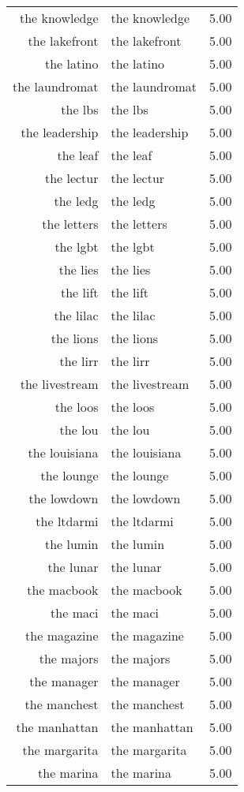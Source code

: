\begin{table}[ht]
\begin{tabular}{rlr}
  the knowledge & the knowledge & 5.00 \\ 
  the lakefront & the lakefront & 5.00 \\ 
  the latino & the latino & 5.00 \\ 
  the laundromat & the laundromat & 5.00 \\ 
  the lbs & the lbs & 5.00 \\ 
  the leadership & the leadership & 5.00 \\ 
  the leaf & the leaf & 5.00 \\ 
  the lectur & the lectur & 5.00 \\ 
  the ledg & the ledg & 5.00 \\ 
  the letters & the letters & 5.00 \\ 
  the lgbt & the lgbt & 5.00 \\ 
  the lies & the lies & 5.00 \\ 
  the lift & the lift & 5.00 \\ 
  the lilac & the lilac & 5.00 \\ 
  the lions & the lions & 5.00 \\ 
  the lirr & the lirr & 5.00 \\ 
  the livestream & the livestream & 5.00 \\ 
  the loos & the loos & 5.00 \\ 
  the lou & the lou & 5.00 \\ 
  the louisiana & the louisiana & 5.00 \\ 
  the lounge & the lounge & 5.00 \\ 
  the lowdown & the lowdown & 5.00 \\ 
  the ltdarmi & the ltdarmi & 5.00 \\ 
  the lumin & the lumin & 5.00 \\ 
  the lunar & the lunar & 5.00 \\ 
  the macbook & the macbook & 5.00 \\ 
  the maci & the maci & 5.00 \\ 
  the magazine & the magazine & 5.00 \\ 
  the majors & the majors & 5.00 \\ 
  the manager & the manager & 5.00 \\ 
  the manchest & the manchest & 5.00 \\ 
  the manhattan & the manhattan & 5.00 \\ 
  the margarita & the margarita & 5.00 \\ 
  the marina & the marina & 5.00 \\ 

\end{tabular}
\end{table}
